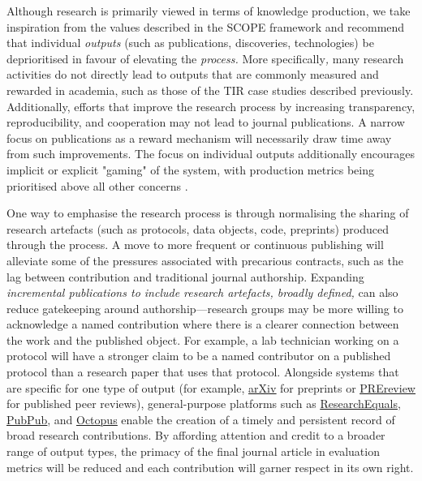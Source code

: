 \documentclass[authordate,meta,issue]{jote-new-article}
\begin{document}
Although research is primarily viewed in terms of knowledge production, we take inspiration from the values described in the SCOPE framework \parencites{INORMS2022} and recommend that individual \emph{outputs} (such as publications, discoveries, technologies) be deprioritised in favour of elevating the \emph{process.} More specifically\emph{, }many research activities do not directly lead to outputs that are commonly measured and rewarded in academia,\emph{ }such as those of the TIR case studies described previously. Additionally, efforts that improve the research process by increasing transparency, reproducibility, and cooperation may not lead to journal publications. A narrow focus on publications as a reward mechanism will necessarily draw time away from such improvements. The focus on individual outputs additionally encourages implicit or explicit "gaming" of the system, with production metrics being prioritised above all other concerns \parencites[Goodhart's law;][]{Goodhart1984}.



One way to emphasise the research process is through normalising the sharing of research artefacts (such as protocols, data objects, code, preprints) produced through the process. A move to more frequent or continuous publishing will alleviate some of the pressures associated with precarious contracts, such as the lag between contribution and traditional journal authorship. Expanding \emph{incremental publications to include research artefacts, broadly defined, }can also reduce gatekeeping around authorship—research groups may be more willing to acknowledge a named contribution where there is a clearer connection between the work and the published object. For example, a lab technician working on a protocol will have a stronger claim to be a named contributor on a published protocol than a research paper that uses that protocol. Alongside systems that are specific for one type of output (for example, \href{https://arxiv.org}{\underline{arXiv}} for preprints or \href{https://prereview.org}{\underline{PREreview}} for published peer reviews), general-purpose platforms such as \href{https://www.researchequals.com}{\underline{ResearchEquals}}, \href{https://www.pubpub.org/}{\underline{PubPub}}, and \href{https://blog.science-octopus.org}{\underline{Octopus}} enable the creation of a timely and persistent record of broad research contributions. By affording attention and credit to a broader range of output types, the primacy of the final journal article in evaluation metrics will be reduced and each contribution will garner respect in its own right.
\end{document}

